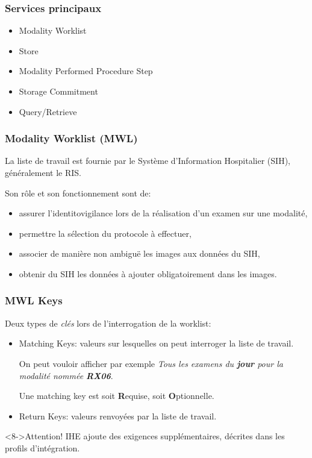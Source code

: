 	\frame
	{
		\frametitle{Services principaux}
		\begin{itemize}
			\item Modality Worklist
			\item Store
			\item Modality Performed Procedure Step
			\item Storage Commitment
			\item Query/Retrieve
		\end{itemize}
	}
	
	\frame
	{
		\frametitle{Modality Worklist (MWL)}
		La liste de travail est fournie par le Syst\`eme d'Information Hospitalier (SIH), g\'en\'eralement le RIS.
		
		Son r\^ole et son fonctionnement sont de:
		\begin{itemize}
			\item<2-> assurer l'identitovigilance lors de la r\'ealisation d'un examen sur une modalit\'e,
			\item<3-> permettre la s\'election du protocole \`a effectuer,
			\item<4-> associer de mani\`ere non ambigu\"e les images aux donn\'ees du SIH,
			\item<5-> obtenir du SIH les donn\'ees \`a ajouter obligatoirement dans les images.
		\end{itemize}
		
	}
	
	\frame
	{
		\frametitle{MWL Keys}
			Deux types de \emph{cl\'es} lors de l'interrogation de la worklist:
			\begin{itemize}
				\item<2-> Matching Keys: valeurs sur lesquelles on peut interroger la liste de travail.
				
				On peut vouloir afficher par exemple \emph{Tous les examens du \textbf{jour} pour la modalit\'e nomm\'ee \textbf{RX06}}.
				
				Une matching key est soit \textbf{R}equise, soit \textbf{O}ptionnelle.
				\item<3-> Return Keys: valeurs renvoy\'ees par la liste de travail.
			\end{itemize}

        \begin{alertblock}<8->{Attention!}
            IHE ajoute des exigences suppl\'ementaires, d\'ecrites dans les profils d'int\'egration.
        \end{alertblock}
	}
	
